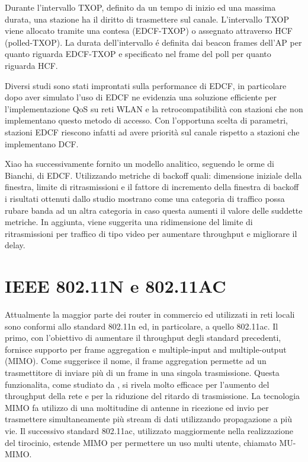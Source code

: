 Durante l'intervallo TXOP, definito da un tempo di inizio ed una massima durata, una stazione ha il diritto di trasmettere sul canale.
L'intervallo TXOP viene allocato tramite una contesa (EDCF-TXOP) o assegnato attraverso HCF (polled-TXOP).
La durata dell'intervallo \'e definita dai beacon frames dell'AP per quanto riguarda EDCF-TXOP e specificato nel frame del poll per quanto riguarda HCF.

Diversi studi sono stati improntati sulla performance di EDCF, in particolare \cite{mangold2002ieee} dopo aver simulato l'uso di EDCF ne evidenzia una soluzione efficiente per l'implementazione QoS su reti WLAN e la retrocompatibilit\`a con stazioni che non implementano questo metodo di accesso.
Con l'opportuna scelta di parametri, stazioni EDCF riescono infatti ad avere priorit\`a sul canale rispetto a stazioni che implementano DCF.

Xiao \cite{xiao2004performance} ha successivamente fornito un modello analitico, seguendo le orme di Bianchi, di EDCF.
Utilizzando metriche di backoff quali: dimensione iniziale della finestra, limite di ritrasmissioni e il fattore di incremento della finestra di backoff i risultati ottenuti dallo studio mostrano come una categoria di traffico possa rubare banda ad un altra categoria in caso questa aumenti il valore delle suddette metriche.
In aggiunta, viene suggerita una ridimensione del limite di ritrasmissioni per traffico di tipo video per aumentare throughput e migliorare il delay.

\newpage


\section{IEEE 802.11N e 802.11AC}

Attualmente la maggior parte dei router in commercio ed utilizzati in reti locali sono conformi allo standard 802.11n ed, in particolare, a quello 802.11ac.
Il primo, con l'obiettivo di aumentare il throughput degli standard precedenti, fornisce supporto per frame aggregation e multiple-input and multiple-output (MIMO).
Come suggerisce il nome, il frame aggregation permette ad un trasmettitore di inviare pi\`u di un frame in una singola trasmissione.
Questa funzionalita, come studiato da  \cite{skordoulis2008ieee}, si rivela molto efficace per l'aumento del throughput della rete e per la riduzione del ritardo di trasmissione.
La tecnologia MIMO fa utilizzo di una moltitudine di antenne in ricezione ed invio per trasmettere simultaneamente pi\`u stream di dati utilizzando propagazione a pi\`u vie.
Il successivo standard 802.11ac, utilizzato maggiormente nella realizzazione del tirocinio, estende MIMO per permettere un uso multi utente, chiamato  MU-MIMO.

